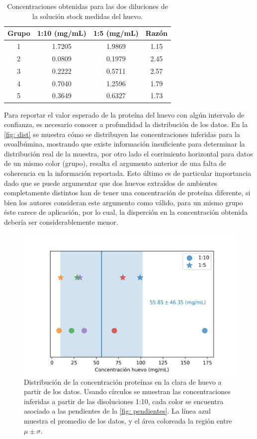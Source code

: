 \documentclass[fleqn,10pt]{SelfArx}
\begin{document}
	\begin{table}[h]
		\centering
		\caption{Concentraciones obtenidas para las dos diluciones de la soluci\'on stock medidas del huevo.}
		\label{tb: huevo_concentraciones}
		\begin{tabular}{c|cc|c}
			\hline
			\textbf{Grupo} & \textbf{1:10 (mg/mL)} & \textbf{1:5 (mg/mL)} & \textbf{Raz\'on} \\
			\hline
			1 & 1.7205 & 1.9869 & 1.15 \\
			2 & 0.0809 & 0.1979 & 2.45 \\
			3 & 0.2222 & 0.5711 & 2.57 \\
			4 & 0.7040 & 1.2596 & 1.79 \\
			5 & 0.3649 & 0.6327 & 1.73 \\
			\hline
		\end{tabular}
	\end{table}

	Para reportar el valor esperado de la prote\'ina del huevo con alg\'un intervalo de confianza, es necesario conocer a profundidad la distribuci\'on de los datos. En la \autoref{fig: dist} se muestra c\'omo se distribuyen las concentraciones inferidas para la ovoalb\'umina, mostrando que existe informaci\'on insuficiente para determinar la distribuci\'on real de la muestra, por otro lado el corrimiento horizontal para datos de un mismo color (grupo), resalta el argumento anterior de una falta de coherencia en la informaci\'on reportada. Esto \'ultimo es de particular importancia dado que se puede argumentar que dos huevos extra\'idos de ambientes completamente distintos han de tener una concentraci\'on de prote\'ina diferente, si bien los autores consideran este argumento como v\'alido, para un mismo grupo \'este carece de aplicaci\'on, por lo cual, la disperci\'on en la concentraci\'on obtenida deber\'ia ser considerablemente menor.
	\begin{figure}[h]
		\centering
		\includegraphics[width=\linewidth]{concentraciones}
		\caption{Distribuci\'on de la concentraci\'on prote\'inas en la clara de huevo a partir de los datos. Usando c\'irculos se muestran las concentraciones inferidas a partir de las disoluciones 1:10, cada color se encuentra asociado a las pendientes de la \autoref{fig: pendientes}. La l\'inea azul muestra el promedio de los datos, y el \'area coloreada la regi\'on entre $\mu \pm \sigma$.}
		\label{fig: dist}
	\end{figure}
\end{document}
